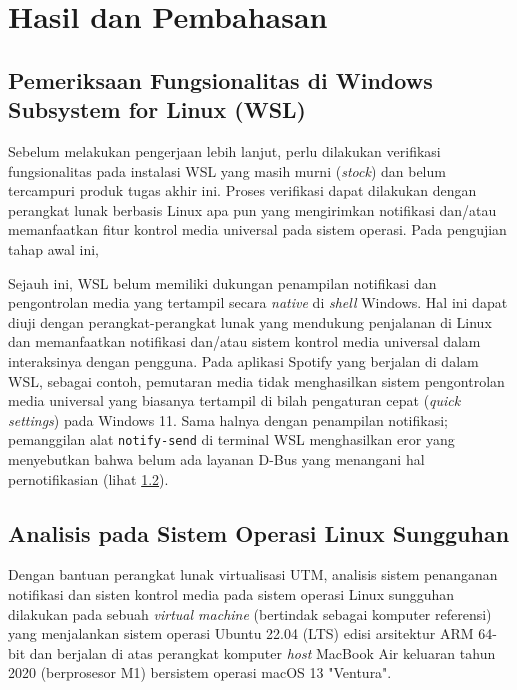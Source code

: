 \chapter{Hasil dan Pembahasan}

\section{Pemeriksaan Fungsionalitas di Windows Subsystem for Linux (WSL)}

Sebelum melakukan pengerjaan lebih lanjut, perlu dilakukan verifikasi fungsionalitas pada instalasi WSL yang masih murni (\textit{stock}) dan belum tercampuri produk tugas akhir ini. Proses verifikasi dapat dilakukan dengan perangkat lunak berbasis Linux apa pun yang mengirimkan notifikasi dan/atau memanfaatkan fitur kontrol media universal pada sistem operasi. Pada pengujian tahap awal ini, 

Sejauh ini, WSL belum memiliki dukungan penampilan notifikasi dan pengontrolan media yang tertampil secara \textit{native} di \textit{shell} Windows. Hal ini dapat diuji dengan perangkat-perangkat lunak yang mendukung penjalanan di Linux dan memanfaatkan notifikasi dan/atau sistem kontrol media universal dalam interaksinya dengan pengguna. Pada aplikasi Spotify yang berjalan di dalam WSL, sebagai contoh, pemutaran media tidak menghasilkan sistem pengontrolan media universal yang biasanya tertampil di bilah pengaturan cepat (\textit{quick settings}) pada Windows 11. Sama halnya dengan penampilan notifikasi; pemanggilan alat \verb|notify-send| di terminal WSL menghasilkan eror yang menyebutkan bahwa belum ada layanan D-Bus yang menangani hal pernotifikasian (lihat \ref{}).



\section{Analisis pada Sistem Operasi Linux Sungguhan}

Dengan bantuan perangkat lunak virtualisasi UTM, analisis sistem penanganan notifikasi dan sisten kontrol media pada sistem operasi Linux sungguhan dilakukan pada sebuah \textit{virtual machine} (bertindak sebagai komputer referensi) yang menjalankan sistem operasi Ubuntu 22.04 (LTS) edisi arsitektur ARM 64-bit dan berjalan di atas perangkat komputer \textit{host} MacBook Air keluaran tahun 2020 (berprosesor M1) bersistem operasi macOS 13 "Ventura".

